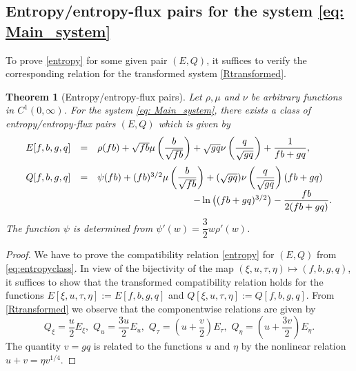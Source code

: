 \documentclass[11pt]{article}
\numberwithin{equation}{section}
\newtheorem{theorem} {Theorem}[section]
\newtheorem{counter example}[theorem]{Counter Example}
\begin{document}
{\subsection{Entropy/entropy-flux pairs for the system \eqref{eq: Main_system}\label{subsec:4.2}}
To prove \eqref{entropy} for some given pair $(E,Q)$, it suffices to verify the corresponding relation for the transformed system \eqref{Rtransformed}.
\begin{theorem}[Entropy/entropy-flux pairs] \label{theo1}Let $\rho, \mu$ and $\nu$ be arbitrary functions in  $C^1(0,\infty)$.
For the system \eqref{eq: Main_system}, there exists a class of entropy/entropy-flux pairs $( E, Q)$ which is 
given by
\begin{equation}\label{eq:entropyclass}
\begin{array}{rcl}
 E[f, b, g, q]&=& \rho(fb)+\sqrt{fb}\mu\left(\dfrac{b}{\sqrt{fb}}\right)+\sqrt{gq}\nu\left(\dfrac{q}{\sqrt{gq}}\right)+\dfrac{1}{fb+gq},\\[3ex]
 Q[f, b, g, q]&=&\psi(fb)+(fb)^{3/2} \mu\left(\dfrac{b}{\sqrt{fb}}\right)+(\sqrt{gq}) \nu\left(\dfrac{q}{\sqrt{gq}}\right)(fb+gq)\\
&&\hspace{3.5 cm}-\ln \left((fb+gq)^{3/2}\right)-\dfrac{fb}{2(fb+gq)}.
\end{array}
\end{equation}
The function $\psi$ is determined from $\psi'(w)=\dfrac{3}{2}  w\rho'(w)$.%
\end{theorem}
\begin{proof} We have to prove the compatibility relation \eqref{entropy} for $(E,Q)$ from \eqref{eq:entropyclass}.  In view of  the bijectivity of the map $(\xi, u, \tau, \eta)\mapsto (f, b, g, q)$, it suffices to  show that 
the transformed compatibility relation holds for the functions $E[\xi, u, \tau, \eta] := E[f, b, g, q]$ and
$Q[\xi, u, \tau, \eta] := Q[f, b, g, q]$.  From \eqref{Rtransformed} we observe that the componentwise 
relations are given by 
\begin{equation}\label{eq: 4.6Relations}
Q_{\xi}=\dfrac{u}{2} E_{\xi},  \,  \,%
    Q_u=\dfrac{3u}{2}E_u,   \,\, %
    Q_{\tau}=\left(u+\dfrac{v}{2}\right) E_{\tau},    \, \, %
    Q_{\eta}= \left(u+\dfrac{3v}{2}\right) E_{\eta}.
\end{equation} 
The quantity $v= gq$ is related to the functions $u$ and $\eta$ by the nonlinear relation $u+v=\eta v^{1/4}$.


\end{proof}}
\end{document}
